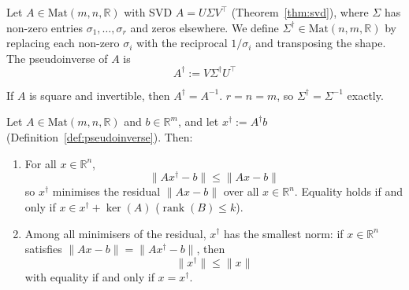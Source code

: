 	\begin{definition}
		\label{def:pseudoinverse}
		Let $A \in \mathrm{Mat}(m,n,\mathbb{R})$ with SVD $A = U \Sigma V^\top$ (Theorem~\ref{thm:svd}), where $\Sigma$ has non-zero entries $\sigma_1, \dots, \sigma_r$ and zeros elsewhere. We define $\Sigma^\dagger \in \mathrm{Mat}(n, m, \mathbb{R})$ by replacing each non-zero $\sigma_i$ with the reciprocal $1/\sigma_i$ and transposing the shape. The pseudoinverse of $A$ is
		\[
			A^\dagger := V \Sigma^\dagger U^\top
		\]
	\end{definition}
	
	\begin{remark}
		If $A$ is square and invertible, then $A^\dagger = A^{-1}$. $r=n=m$, so $\Sigma^\dagger = \Sigma^{-1}$ exactly.
	\end{remark}
	
	\begin{proposition}
		\label{prop:least-squares-pseudoinverse}
		Let $A \in \mathrm{Mat}(m, n, \mathbb{R})$ and $b \in \mathbb{R}^m$, and let $x^\dagger := A^\dagger b$ (Definition~\ref{def:pseudoinverse}). Then:
		\begin{enumerate}[label=\roman*.]
			\item For all $x \in \mathbb{R}^n$,
			\[
				\|Ax^\dagger - b\| \le \|Ax - b\|
			\]
			so $x^\dagger$ minimises the residual $\|Ax-b\|$ over all $x\in\mathbb{R}^n$. Equality holds if and only if $x \in x^\dagger + \ker(A)$ ($\operatorname{rank}(B)\le k$).
			\item Among all minimisers of the residual, $x^\dagger$ has the smallest norm: if $x\in\mathbb{R}^n$ satisfies $\|Ax-b\| = \|Ax^\dagger - b\|$, then
			\[
				\|x^\dagger\| \le \|x\|
			\]
			with equality if and only if $x = x^\dagger$.
		\end{enumerate}
	\end{proposition}
	
